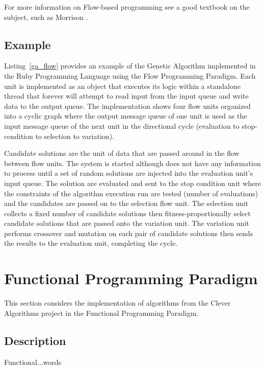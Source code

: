\documentclass[a4paper, 11pt]{article}
\begin{document}
For more information on Flow-based programming see a good textbook on the subject, such as Morrison \cite{Morrison2010}.

\subsection{Example}
Listing~\ref{ga_flow} provides an example of the Genetic Algorithm implemented in the Ruby Programming Language using the Flow Programming Paradigm.
Each unit is implemented as an object that executes its logic within a standalone thread that forever will attempt to read input from the input queue and write data to the output queue. The implementation shows four flow units organized into a cyclic graph where the output message queue of one unit is used as the input message queue of the next unit in the directional cycle (evaluation to stop-condition to selection to variation). 

Candidate solutions are the unit of data that are passed around in the flow between flow units.
The system is started although does not have any information to process until a set of random solutions are injected into the evaluation unit's input queue. The solution are evaluated and sent to the stop condition unit where the constraints of the algorithm execution run are tested (number of evaluations) and the candidates are passed on to the selection flow unit. The selection unit collects a fixed number of candidate solutions then fitness-proportionally select candidate solutions that are passed onto the variation unit. The variation unit performs crossover and mutation on each pair of candidate solutions then sends the results to the evaluation unit, completing the cycle.



\section{Functional Programming Paradigm}
This section considers the implementation of algorithms from the Clever Algorithms project in the Functional Programming Paradigm.

\subsection{Description}
Functional...words
\end{document}

